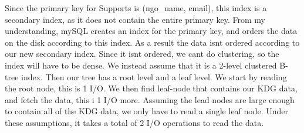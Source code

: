 \documentclass[working, oneside]{../../Preambles/tuftebook}
\begin{document}
Since the primary key for Supports is (ngo\_name, email), this index is a secondary index, as it does not contain the entire primary key. From my understanding, mySQL creates an index for the primary key, and orders the data on the disk according to this index. As a result the data isnt ordered according to our new secondary index. Since it isnt ordered, we cant do clustering, so the index will have to be dense. We instead assume that it is a 2-level clustered B-tree index. Then our tree has a root level and a leaf level. We start by reading the root node, this is 1 I/O. We then find leaf-node that contains our KDG data, and fetch the data, this i 1 I/O more. Assuming the lead nodes are large enough to contain all of the KDG data, we only have to read a single leaf node. Under these assumptions, it takes a total of 2 I/O operations to read the data.
\end{document}
